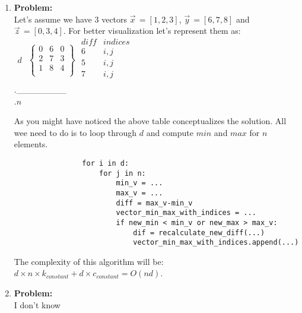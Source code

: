\documentclass[11pt,a4paper,english]{article}
\begin{document}
\begin{enumerate}
        \item \textbf{Problem:} \textit{}\\
            Let's assume we have 3 vectors $\vec{x}^{\,}=[1,2,3]$, $\vec{y}^{\,}=[6,7,8]$ and $\vec{z}^{\,}=[0,3,4]$.
            For better visualization let's represent them as:\\
            $\begin{matrix}
                \\
                \\
                d\\
                \\
            \end{matrix}$
            $\left\{
            \begin{matrix}
                0 & 6 & 0\\
                2 & 7 & 3\\
                1 & 8 & 4\\
            \end{matrix}
            \right\}$ \qquad
            $\begin{matrix}
                {diff}   &     indices\\
                6        &     i,j\\
                5        &     i,j\\
                7        &     i,j\\
            \end{matrix}$\\
            .\space\space\space\space\space\_\_\_\_\_\_\_\_ \\
            .\space\space\space\space\space\space\space $n$

            As you might have noticed the above table conceptualizes the solution. All wee need to do
            is to loop through $d$ and compute $min$ and $max$ for $n$ elements.
            \begin{verbatim}
                for i in d:
                    for j in n:
                        min_v = ...
                        max_v = ...
                        diff = max_v-min_v
                        vector_min_max_with_indices = ...
                        if new_min < min_v or new_max > max_v:
                            dif = recalculate_new_diff(...)
                            vector_min_max_with_indices.append(...)
            \end{verbatim}

            The complexity of this algorithm will be:
            $d\times n\times k_{constant} + d \times c_{constant} = O(nd)$.
        \item \textbf{Problem:} \textit{}\\
            I don't know
      \end{enumerate}
  
\end{document}
